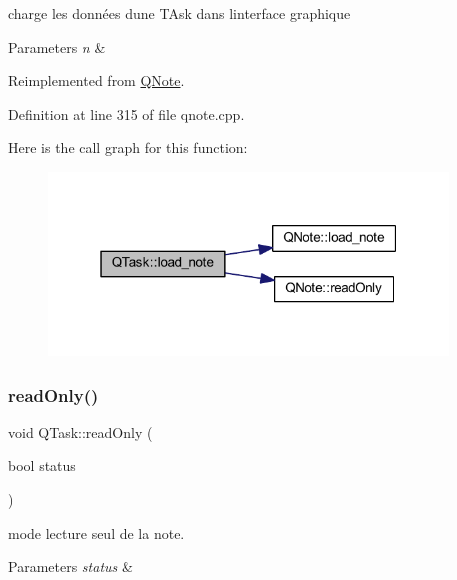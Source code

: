 charge les données d\textquotesingle{}une T\+Ask dans l\textquotesingle{}interface graphique 


\begin{DoxyParams}{Parameters}
{\em n} & \\
\hline
\end{DoxyParams}


Reimplemented from \hyperlink{class_q_note_adca0a8f2851fbb1c3843ca4fe7957c11}{Q\+Note}.



Definition at line 315 of file qnote.\+cpp.

Here is the call graph for this function\+:\nopagebreak
\begin{figure}[H]
\begin{center}
\leavevmode
\includegraphics[width=301pt]{class_q_task_a548fc51beaa1dcea345c362782aa11c0_cgraph}
\end{center}
\end{figure}
\mbox{\label{class_q_task_a1bf9080c14e7a94094bde3fa315d66d9}} 
\subsubsection{\texorpdfstring{read\+Only()}{readOnly()}}
{\footnotesize\ttfamily void Q\+Task\+::read\+Only (\begin{DoxyParamCaption}\item[{bool}]{status }\end{DoxyParamCaption})\hspace{0.3cm}{\ttfamily [virtual]}}



mode lecture seul de la note. 


\begin{DoxyParams}{Parameters}
{\em status} & \\
\hline
\end{DoxyParams}



